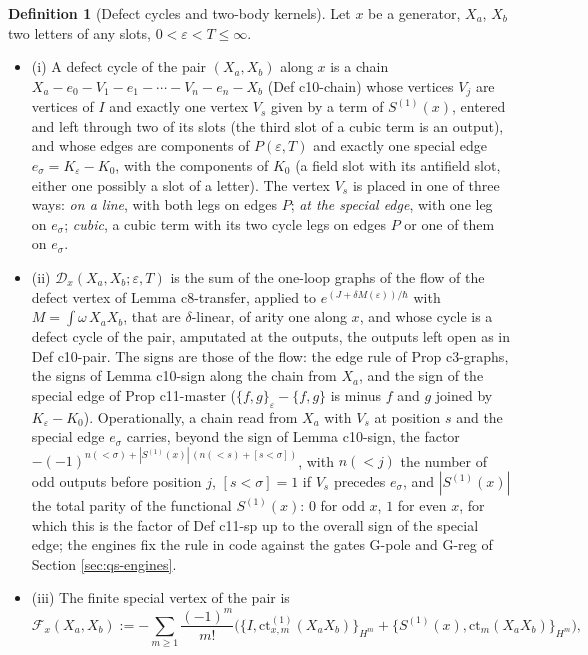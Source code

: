 \documentclass[11pt]{article}
\numberwithin{equation}{section}
\theoremstyle{plain}
\theoremstyle{definition}
\newtheorem{definition}[theorem]{Definition}
\begin{document}
\begin{definition}[Defect cycles and two-body kernels]
\label{def:qs-defect}
Let $x$ be a generator, $X_a$, $X_b$ two letters of any slots, $0<\varepsilon<T\le\infty$.
\begin{itemize}
\item (i) A defect cycle of the pair $(X_a,X_b)$ along $x$ is a chain $X_a-e_0-V_1-e_1-\cdots-V_n-e_n-X_b$ (Def c10-chain) whose vertices $V_j$ are vertices of $I$ and exactly one vertex $V_s$ given by a term of $S^{(1)}(x)$, entered and left through two of its slots (the third slot of a cubic term is an output), and whose edges are components of $P(\varepsilon,T)$ and exactly one special edge $e_\sigma=K_\varepsilon-K_0$, with the components of $K_0$ (a field slot with its antifield slot, either one possibly a slot of a letter). The vertex $V_s$ is placed in one of three ways: \emph{on a line}, with both legs on edges $P$; \emph{at the special edge}, with one leg on $e_\sigma$; \emph{cubic}, a cubic term with its two cycle legs on edges $P$ or one of them on $e_\sigma$.
\item (ii) $\mathcal D_x(X_a,X_b;\varepsilon,T)$ is the sum of the one-loop graphs of the flow of the defect vertex of Lemma c8-transfer, applied to $e^{(J+\delta M(\varepsilon))/\hbar}$ with $M=\int\omega\,X_aX_b$, that are $\delta$-linear, of arity one along $x$, and whose cycle is a defect cycle of the pair, amputated at the outputs, the outputs left open as in Def c10-pair. The signs are those of the flow: the edge rule of Prop c3-graphs, the signs of Lemma c10-sign along the chain from $X_a$, and the sign of the special edge of Prop c11-master ($\{f,g\}_\varepsilon-\{f,g\}$ is minus $f$ and $g$ joined by $K_\varepsilon-K_0$). Operationally, a chain read from $X_a$ with $V_s$ at position $s$ and the special edge $e_\sigma$ carries, beyond the sign of Lemma c10-sign, the factor $-(-1)^{n(<\sigma)+|S^{(1)}(x)|\,(n(<s)+[s<\sigma])}$, with $n(<j)$ the number of odd outputs before position $j$, $[s<\sigma]=1$ if $V_s$ precedes $e_\sigma$, and $|S^{(1)}(x)|$ the total parity of the functional $S^{(1)}(x)$: $0$ for odd $x$, $1$ for even $x$, for which this is the factor of Def c11-sp up to the overall sign of the special edge; the engines fix the rule in code against the gates G-pole and G-reg of Section \ref{sec:qs-engines}.
\item (iii) The finite special vertex of the pair is
\begin{equation}
\mathcal F_x(X_a,X_b):=-\sum_{m\ge1}\frac{(-1)^m}{m!}\Big(\big\{I,\mathrm{ct}^{(1)}_{x,m}(X_aX_b)\big\}_{H^m}+\big\{S^{(1)}(x),\mathrm{ct}_m(X_aX_b)\big\}_{H^m}\Big),

\end{equation}
\end{itemize}
\end{definition}
\end{document}
